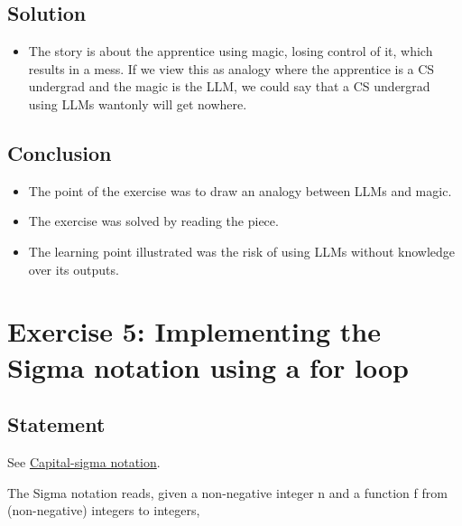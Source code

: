 \documentclass[12pt]{article}
\begin{document}

\subsection{Solution}

\begin{itemize}
\item The story is about the apprentice using magic, losing control of it, which results in a mess. If we view this as analogy where the apprentice is a CS undergrad and the magic is the LLM, we could say that a CS undergrad using LLMs wantonly will get nowhere.
\end{itemize}


\subsection{Conclusion}

\begin{itemize}

\item
  The point of the exercise was to draw an analogy between LLMs and magic.

\item
  The exercise was solved by reading the piece.

\item
  The learning point illustrated was the risk of using LLMs without knowledge over its outputs.

\end{itemize}


\newpage

\section{Exercise 5: Implementing the Sigma notation using a for loop}


\subsection{Statement}

See \href{https://en.wikipedia.org/wiki/Capital-sigma_notation}{Capital-sigma notation}.

The Sigma notation reads, given a non-negative integer n and a function f from
(non-negative) integers to integers,
\end{document}
